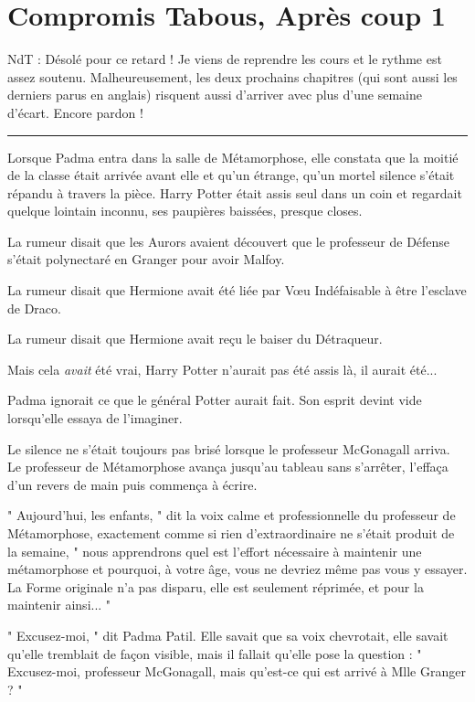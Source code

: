 
\chapter{Compromis Tabous, Après coup 1}

NdT : Désolé pour ce retard ! Je viens de reprendre les cours et le rythme est assez soutenu. Malheureusement, les deux prochains chapitres (qui sont aussi les derniers parus en anglais) risquent aussi d'arriver avec plus d'une semaine d'écart. Encore pardon !
\par\noindent\rule{\textwidth}{0.4pt}
Lorsque Padma entra dans la salle de Métamorphose, elle constata que la moitié de la classe était arrivée avant elle et qu'un étrange, qu'un mortel silence s'était répandu à travers la pièce. Harry Potter était assis seul dans un coin et regardait quelque lointain inconnu, ses paupières baissées, presque closes.

La rumeur disait que les Aurors avaient découvert que le professeur de Défense s'était polynectaré en Granger pour avoir Malfoy.

La rumeur disait que Hermione avait été liée par Vœu Indéfaisable à être l'esclave de Draco.

La rumeur disait que Hermione avait reçu le baiser du Détraqueur.

Mais cela \emph{avait}  été vrai, Harry Potter n'aurait pas été assis là, il aurait été...

Padma ignorait ce que le général Potter aurait fait. Son esprit devint vide lorsqu'elle essaya de l'imaginer.

Le silence ne s'était toujours pas brisé lorsque le professeur McGonagall arriva. Le professeur de Métamorphose avança jusqu'au tableau sans s'arrêter, l'effaça d'un revers de main puis commença à écrire.

" Aujourd'hui, les enfants, " dit la voix calme et professionnelle du professeur de Métamorphose, exactement comme si rien d'extraordinaire ne s'était produit de la semaine, " nous apprendrons quel est l'effort nécessaire à maintenir une métamorphose et pourquoi, à votre âge, vous ne devriez même pas vous y essayer. La Forme originale n'a pas disparu, elle est seulement réprimée, et pour la maintenir ainsi... "

" Excusez-moi, " dit Padma Patil. Elle savait que sa voix chevrotait, elle savait qu'elle tremblait de façon visible, mais il fallait qu'elle pose la question : " Excusez-moi, professeur McGonagall, mais qu'est-ce qui est arrivé à Mlle Granger ? "

